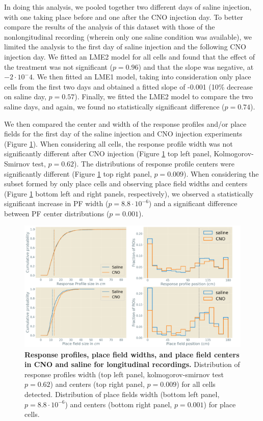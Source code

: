 In doing this analysis, we pooled together two different days of saline injection, with one taking place before and one after the CNO injection day. 
To better compare the results of the analysis of this dataset with those of the nonlongitudinal recording (wherein only one saline condition was available), we limited the analysis to the first day of saline injection and the following CNO injection day.
We fitted an LME2 model for all cells and found that the effect of the treatment was not significant ($p=0.96$) and that the slope was negative, at $-2\cdot 10^-4$.
We then fitted an LME1 model, taking into consideration only place cells from the first two days and obtained a fitted slope of -0.001 (10\% decrease on saline day, $p=0.57$).
Finally, we fitted the LME2 model to compare the two saline days, and again, we found no statistically significant difference ($p=0.74$).  

We then compared the center and width of the response profiles and/or place fields for the first day of the saline injection and CNO injection experiments (Figure \ref{fig:chap4:pf_width_center_long}).
When considering all cells, the response profile width was not significantly different after CNO injection (Figure \ref{fig:chap4:pf_width_center_long} top left panel, Kolmogorov-Smirnov test, $p=0.62$).
The distributions of response profile centers were significantly different (Figure \ref{fig:chap4:pf_width_center_long} top right panel, $p=0.009$).
When considering the subset formed by only place cells and observing place field widths and centers (Figure \ref{fig:chap4:pf_width_center_long} bottom left and right panels, respectively), we observed a statistically significant increase in PF width ($p=8.8 \cdot 10^{-6}$) and a significant difference between PF center distributions ($p=0.001$).
\begin{figure}
    \centering
    \includegraphics[width=\textwidth]{Figures/Chapter4/pf_width_center_long.pdf}
    \caption[Response profiles, place field widths, and place field centers in CNO and saline for longitudinal recordings]{\textbf{Response profiles, place field widths, and place field centers in CNO and saline for longitudinal recordings.} 
    Distribution of response profiles width (top left panel, kolmogorov-smirnov test $p=0.62$) and centers (top right panel, $p=0.009$) for all cells detected.
    Distribution of place fields width (bottom left panel, $p=8.8 \cdot 10^{-6}$) and centers (bottom right panel, $p=0.001$) for place cells.}
    \label{fig:chap4:pf_width_center_long}
\end{figure}

